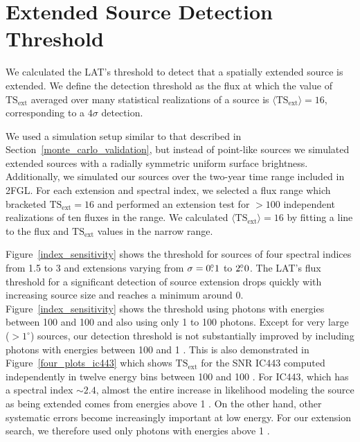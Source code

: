 \documentclass[12pt,preprint]{aastex}
\newcommand{\mev}{\text{MeV}\xspace}
\newcommand{\gev}{\text{GeV}\xspace}
\newcommand{\tsext}{{\ensuremath{\text{TS}_{\text{ext}}}}\xspace}
\newcommand{\degree}{^\circ\xspace}
\begin{document}
\section{Extended Source Detection Threshold}
\label{extension_sensitivity}

We calculated the LAT's threshold to detect that a spatially extended
source is extended. We define the detection threshold as the flux at which the value
of $\tsext$ averaged over many statistical realizations of a source
is $\langle\tsext\rangle=16$, corresponding to a $4\sigma$ detection.

We used a simulation setup similar to that described in
Section~\ref{monte_carlo_validation}, but instead of point-like sources
we simulated extended
sources with a radially symmetric uniform surface
brightness. Additionally, we
simulated our sources over the two-year time range included
in 2FGL.
For each extension and
spectral index, we selected a flux range which bracketed $\tsext=16$
and performed an extension test for $>100$ independent realizations of
ten fluxes in the range.
We calculated $\langle\tsext\rangle=16$ by fitting a line to the flux
and $\tsext$ values in the narrow range.

Figure~\ref{index_sensitivity} shows the threshold for sources of four
spectral indices from 1.5 to 3 and extensions varying from $\sigma=0\mbox{$.\!\!^\circ$}1$
to $2\mbox{$.\!\!^\circ$}0$.  The LAT's flux threshold for a significant detection
of source extension drops quickly with
increasing source size and reaches a minimum around 0. 
Figure~\ref{index_sensitivity} shows
the threshold using photons with energies between 100 \mev and 100 \gev
and also using only 1 \gev to 100 \gev photons.
Except for very large ($>1\degree$) sources, our detection threshold is
not substantially improved by including photons with energies between 100 \mev and
1 \gev.  This is also demonstrated in Figure~\ref{four_plots_ic443}
which shows \tsext for the SNR IC443 computed independently in twelve
energy bins between 100 \mev and 100 \gev. For IC443, which has a
spectral index $\sim2.4$, almost the entire increase in likelihood
modeling the source as being extended comes
from energies above 1 \gev.  On the other hand, other systematic errors
become increasingly important at low energy. For our extension search,
we therefore used only photons with energies above 1 \gev.
\end{document}

